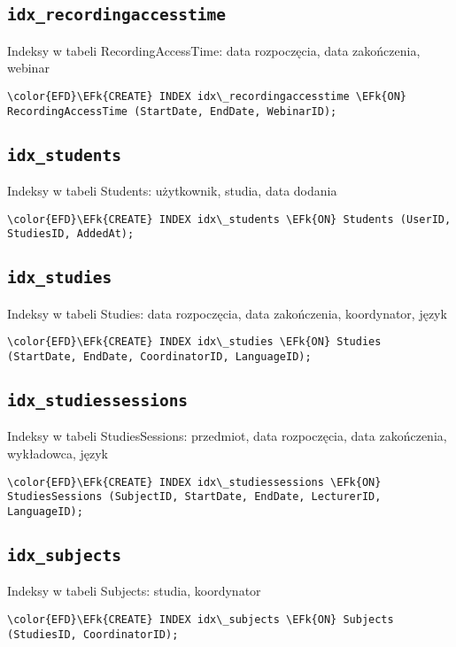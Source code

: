 \documentclass[11pt]{article}
\newcommand{\EFk}[1]{\textcolor{EFk}{\textbf{#1}}} %
\begin{document}
\subsection{\texttt{idx\_recordingaccesstime}}
\label{sec:orgac6ec48}
Indeksy w tabeli RecordingAccessTime: data rozpoczęcia, data zakończenia, webinar
\begin{Code}
\begin{Verbatim}
\color{EFD}\EFk{CREATE} INDEX idx\_recordingaccesstime \EFk{ON} RecordingAccessTime (StartDate, EndDate, WebinarID);
\end{Verbatim}
\end{Code}
\subsection{\texttt{idx\_students}}
\label{sec:org3209623}
Indeksy w tabeli Students: użytkownik, studia, data dodania
\begin{Code}
\begin{Verbatim}
\color{EFD}\EFk{CREATE} INDEX idx\_students \EFk{ON} Students (UserID, StudiesID, AddedAt);
\end{Verbatim}
\end{Code}
\subsection{\texttt{idx\_studies}}
\label{sec:org1ce0390}
Indeksy w tabeli Studies: data rozpoczęcia, data zakończenia, koordynator, język
\begin{Code}
\begin{Verbatim}
\color{EFD}\EFk{CREATE} INDEX idx\_studies \EFk{ON} Studies (StartDate, EndDate, CoordinatorID, LanguageID);
\end{Verbatim}
\end{Code}
\subsection{\texttt{idx\_studiessessions}}
\label{sec:org5265a94}
Indeksy w tabeli StudiesSessions: przedmiot, data rozpoczęcia, data zakończenia, wykładowca, język
\begin{Code}
\begin{Verbatim}
\color{EFD}\EFk{CREATE} INDEX idx\_studiessessions \EFk{ON} StudiesSessions (SubjectID, StartDate, EndDate, LecturerID, LanguageID);
\end{Verbatim}
\end{Code}
\subsection{\texttt{idx\_subjects}}
\label{sec:orga305b83}
Indeksy w tabeli Subjects: studia, koordynator
\begin{Code}
\begin{Verbatim}
\color{EFD}\EFk{CREATE} INDEX idx\_subjects \EFk{ON} Subjects (StudiesID, CoordinatorID);
\end{Verbatim}
\end{Code}
\end{document}
